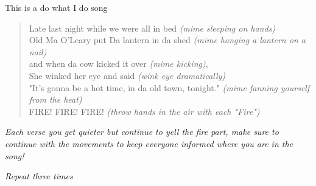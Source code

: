 
This is a do what I do song

\begin{verse}
Late last night while we were all in bed \textit{(mime sleeping on hands)} \\

Old Ma O'Leary put Da lantern in da shed \textit{(mime hanging a lantern on a nail)} \\

and when da cow kicked it over \textit{(mime kicking)}, \\

She winked her eye and said \textit{(wink eye dramatically)} \\

"It's gonna be a hot time, in da old town, tonight." \textit{(mime fanning yourself from the heat)} \\

FIRE! FIRE! FIRE! \textit{(throw hands in the air with each "Fire")} \\
\end{verse}

\textit{Each verse you get quieter but continue to yell the fire part, make sure to continue with the movements to keep everyone informed where you are in the song!}

\textit{Repeat three times}
